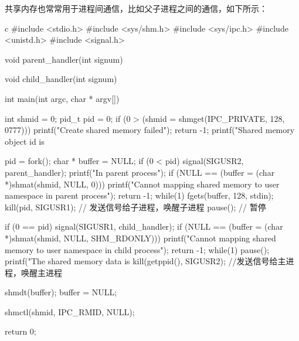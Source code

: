 共享内存也常常用于进程间通信，比如父子进程之间的通信，如下所示：
\begin{code-block}{c}
#include <stdio.h>
#include <sys/shm.h>
#include <sys/ipc.h>
#include <unistd.h>
#include <signal.h>

void parent_handler(int signum)
{
}

void child_handler(int signum)
{
}

int main(int argc, char * argv[])
{
        int shmid = 0;
        pid_t pid = 0;
        if (0 > (shmid = shmget(IPC_PRIVATE, 128, 0777)))
        {
                printf("Create shared memory failed\n");
                return -1;
        }
        printf("Shared memory object id is %

        pid = fork();
        char * buffer = NULL;
        if (0 < pid)
        {
                signal(SIGUSR2, parent_handler);
                printf("In parent process\n");
                if (NULL == (buffer = (char *)shmat(shmid, NULL, 0)))
                {
                        printf("Cannot mapping shared memory to user namespace in parent process\n");
                        return -1;
                }
                while(1)
                {
                        fgets(buffer, 128, stdin);
                        kill(pid, SIGUSR1); // 发送信号给子进程，唤醒子进程
                        pause(); // 暂停
                }
        }

        if (0 == pid)
        {
                signal(SIGUSR1, child_handler);
                if (NULL == (buffer = (char *)shmat(shmid, NULL, SHM_RDONLY)))
                {
                        printf("Cannot mapping shared memory to user namespace in child process\n");
                        return -1;
                }
                while(1)
                {
                        pause();
                        printf("The shared memory data is %
                        kill(getppid(), SIGUSR2); //发送信号给主进程，唤醒主进程
                }
        }

        shmdt(buffer);
        buffer = NULL;

        shmctl(shmid, IPC_RMID, NULL);

        return 0;
}
\end{code-block}

